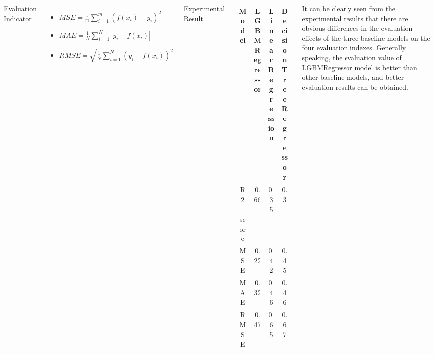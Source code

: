 \documentclass{tikzposter} %
\begin{document}
\begin{columns}
{\begin{description}
     
    \item[Evaluation Indicator]
\end{description}

\begin{itemize}
 \item
${MSE = \frac{1}{m}{\sum\limits_{i = 1}^m {\left( {f\left( {{x_i}} \right) - {y_i}} \right)} ^2}}$

\item
${MAE = \frac{1}{N}\sum\limits_{i = 1}^N {\left| {{y_i} - f\left( {{x_i}} \right)} \right|} }$

\item
${RMSE = \sqrt {\frac{1}{N}\sum\limits_{i = 1}^N {{{\left( {{y_i} - f\left( {{x_i}} \right)} \right)}^2}} } }$

    
\end{itemize}

\begin{description}
     
    \item[Experimental Result]
\end{description}

\vspace{.5cm}



\begin{tabular}{c|c|c|c}
 \toprule
\textbf{Model} & \textbf{LGBMRegressor}      & \textbf{LinearRegression} & \textbf{DecisionTreeRegressor} \\
\midrule
R2\_score      & 0.66                        & 0.35                      & 0.3                            \\
MSE            & {\color[HTML]{FE0000} 0.22} & 0.42                      & 0.45                           \\
MAE            & {\color[HTML]{FE0000} 0.32} & 0.46                      & 0.46                           \\
RMSE           & {\color[HTML]{FE0000} 0.47} & 0.65                      & 0.67  \\
 \bottomrule
\end{tabular}


\vspace{.8cm}
\begin{description}
    \item
    It can be clearly seen from the experimental results that there are obvious differences in the evaluation effects of the three baseline models on the four evaluation indexes. Generally speaking, the evaluation value of LGBMRegressor model is better than other baseline models, and better evaluation results can be obtained.
\end{description}


}
\end{columns}
\end{document}

